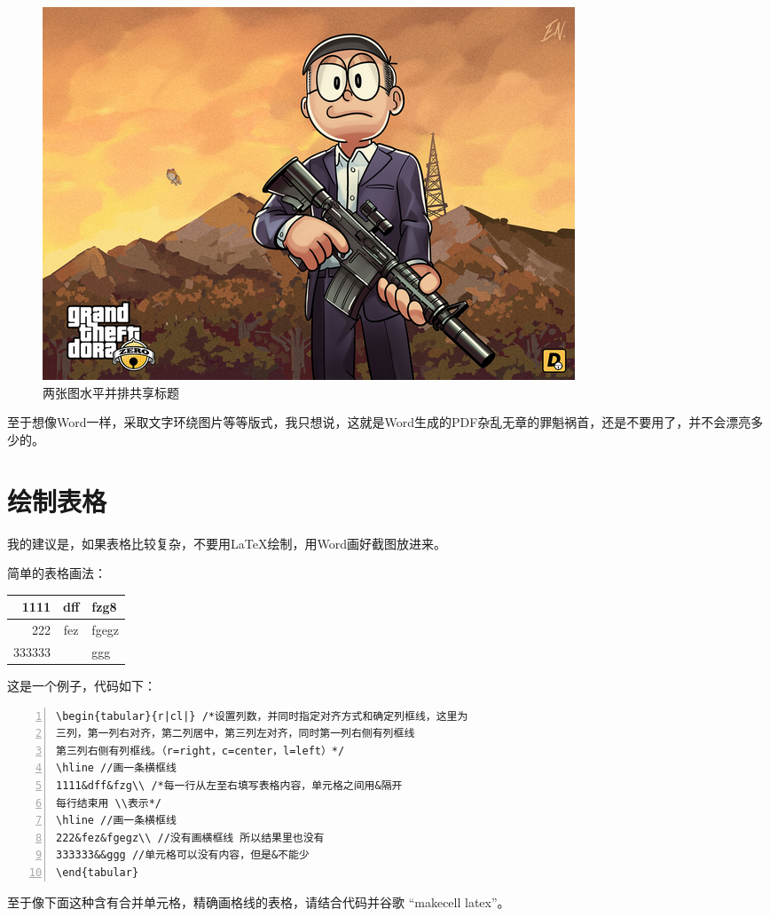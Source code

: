 \documentclass[12pt,a4paper,oneside]{book}
\begin{document}
{\begin{figure}[h]
\includegraphics[scale=0.21]{xf.png}
\caption{两张图水平并排共享标题}
\label{pic:dora}
\end{figure}
\par
至于想像Word一样，采取文字环绕图片等等版式，我只想说，这就是Word生成的PDF杂乱无章的罪魁祸首，还是不要用了，并不会漂亮多少的。
\vspace{2em}
\section{绘制表格}
我的建议是，如果表格比较复杂，不要用\LaTeX 绘制，用Word画好截图放进来。
\par
简单的表格画法：
\par
\begin{center}
\begin{tabular}{r|cl|}
\hline
1111&dff&fzg8\\
\hline
222&fez&fgegz\\
333333&&ggg\\
\end{tabular}
\end{center}

\par
这是一个例子，代码如下：

\par

\begin{lstlisting}[language={[ANSI]C}, numbers=left, numberstyle=\tiny, keywordstyle=\color{blue!70},  frame=shadowbox, rulesepcolor=\color{red!20!green!20!blue!20}]
\begin{tabular}{r|cl|} /*设置列数，并同时指定对齐方式和确定列框线，这里为
三列，第一列右对齐，第二列居中，第三列左对齐，同时第一列右侧有列框线
第三列右侧有列框线。（r=right，c=center，l=left）*/
\hline //画一条横框线
1111&dff&fzg\\ /*每一行从左至右填写表格内容，单元格之间用&隔开
每行结束用 \\表示*/
\hline //画一条横框线
222&fez&fgegz\\ //没有画横框线 所以结果里也没有
333333&&ggg //单元格可以没有内容，但是&不能少
\end{tabular}
\end{lstlisting}
\par
至于像下面这种含有合并单元格，精确画格线的表格，请结合代码并谷歌 “makecell latex”。

}
\end{document}
